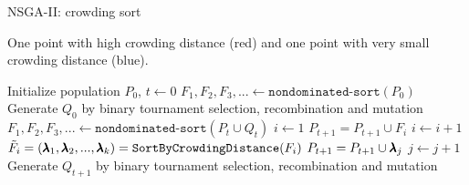 \begin{frame}[allowframebreaks]{NSGA-II: crowding sort}
\begin{footnotesize}
One point with high crowding distance (red) and one point with very small crowding distance (blue).
\end{footnotesize}

\framebreak
\begin{algorithm}[H]

  \begin{center}
  \caption{NSGA-II}
    \begin{algorithmic}[1]
   	\begin{footnotesize}
    \STATE Initialize population $P_0$, $t \leftarrow 0$
    \STATE $F_1, F_2, F_3, ... \leftarrow \texttt{nondominated-sort}(P_0)$
    \STATE Generate $Q_0$ by binary tournament selection, recombination and mutation %
      \REPEAT
        \STATE $F_1, F_2, F_3, ... \leftarrow \texttt{nondominated-sort}(P_t \cup Q_t)$
        \STATE $i \leftarrow 1$
        	\STATE $P_{t + 1} = P_{t + 1} \cup F_i$
        	\STATE $i \leftarrow i + 1$
    	\ENDWHILE
        \STATE $\tilde F_i = (\pmb{\lambda}_1, \pmb{\lambda}_2, ..., \pmb{\lambda}_k)= \texttt{SortByCrowdingDistance}(F_i)$
        	\STATE $P_{t + 1} = P_{t + 1} \cup \pmb{\lambda}_j$
        	\STATE $j \leftarrow j + 1$
        \ENDWHILE
        \STATE Generate $Q_{t + 1}$ by binary tournament selection, recombination and mutation %
      \vspace*{-0.3cm}
      \end{footnotesize}
    \end{algorithmic}
    \end{center}
\end{algorithm}

\end{frame}





